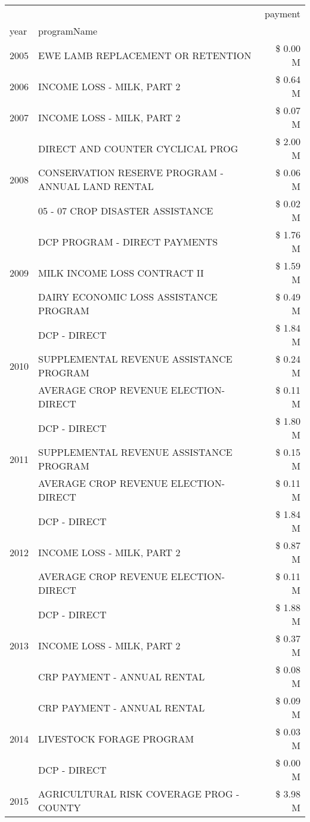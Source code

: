 \begin{tabular}{llr}
\toprule
 &  & payment \\
year & programName &  \\
\midrule
2005 & EWE LAMB REPLACEMENT OR RETENTION & \$ 0.00 M \\
\cline{1-3}
2006 & INCOME LOSS - MILK, PART 2 & \$ 0.64 M \\
\cline{1-3}
2007 & INCOME LOSS - MILK, PART 2 & \$ 0.07 M \\
\cline{1-3}
\multirow[t]{3}{*}{2008} & DIRECT AND COUNTER CYCLICAL PROG & \$ 2.00 M \\
 & CONSERVATION RESERVE PROGRAM - ANNUAL LAND RENTAL & \$ 0.06 M \\
 & 05 - 07 CROP DISASTER ASSISTANCE & \$ 0.02 M \\
\cline{1-3}
\multirow[t]{3}{*}{2009} & DCP PROGRAM - DIRECT PAYMENTS & \$ 1.76 M \\
 & MILK INCOME LOSS CONTRACT II & \$ 1.59 M \\
 & DAIRY ECONOMIC LOSS ASSISTANCE PROGRAM & \$ 0.49 M \\
\cline{1-3}
\multirow[t]{3}{*}{2010} & DCP - DIRECT & \$ 1.84 M \\
 & SUPPLEMENTAL REVENUE ASSISTANCE PROGRAM & \$ 0.24 M \\
 & AVERAGE CROP REVENUE ELECTION-DIRECT & \$ 0.11 M \\
\cline{1-3}
\multirow[t]{3}{*}{2011} & DCP - DIRECT & \$ 1.80 M \\
 & SUPPLEMENTAL REVENUE ASSISTANCE PROGRAM & \$ 0.15 M \\
 & AVERAGE CROP REVENUE ELECTION-DIRECT & \$ 0.11 M \\
\cline{1-3}
\multirow[t]{3}{*}{2012} & DCP - DIRECT & \$ 1.84 M \\
 & INCOME LOSS - MILK, PART 2 & \$ 0.87 M \\
 & AVERAGE CROP REVENUE ELECTION-DIRECT & \$ 0.11 M \\
\cline{1-3}
\multirow[t]{3}{*}{2013} & DCP - DIRECT & \$ 1.88 M \\
 & INCOME LOSS - MILK, PART 2 & \$ 0.37 M \\
 & CRP PAYMENT - ANNUAL RENTAL & \$ 0.08 M \\
\cline{1-3}
\multirow[t]{3}{*}{2014} & CRP PAYMENT - ANNUAL RENTAL & \$ 0.09 M \\
 & LIVESTOCK FORAGE PROGRAM & \$ 0.03 M \\
 & DCP - DIRECT & \$ 0.00 M \\
\cline{1-3}
\multirow[t]{3}{*}{2015} & AGRICULTURAL RISK COVERAGE PROG - COUNTY & \$ 3.98 M \\

\end{tabular}
